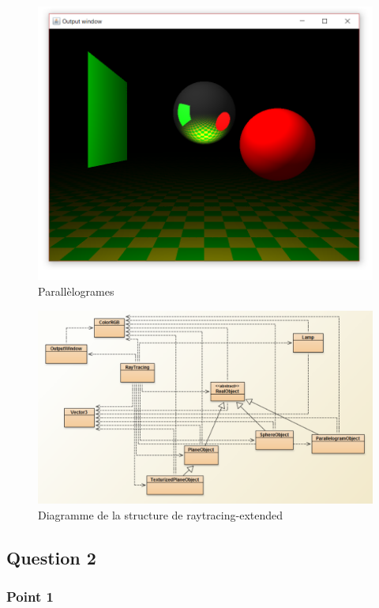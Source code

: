 \begin{figure}[H]
	\caption{\label{10_5} Parallèlogrames}
	\centering
	\includegraphics[scale = 0.4]{10_5.png}
\end{figure}

\begin{figure}[H]
	\caption{\label{10_structure} Diagramme de la structure de raytracing-extended}
	\centering
	\includegraphics[scale = 0.4]{10_structure.png}
\end{figure}

\subsection{Question 2}

\subsubsection{Point 1}

